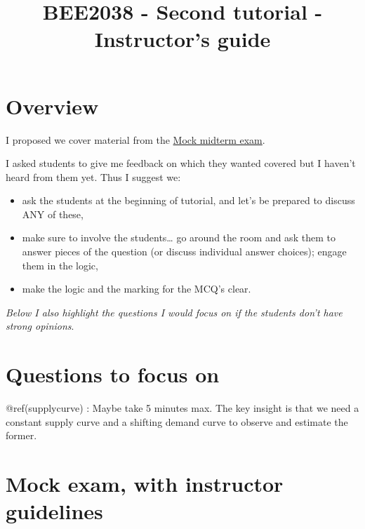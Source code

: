 \documentclass[]{article}
\title{BEE2038 - Second tutorial - Instructor's guide}
\author{}
\date{}
\begin{document}
\maketitle

\hypertarget{overview}{%
\section{Overview}\label{overview}}

I proposed we cover material from the
\href{https://vle.exeter.ac.uk/pluginfile.php/1435123/mod_resource/content/1/_book/ps.html\#mock-mid-term-exam}{Mock
midterm exam}.

I asked students to give me feedback on which they wanted covered but I
haven't heard from them yet. Thus I suggest we:

\begin{itemize}
\item
  ask the students at the beginning of tutorial, and let's be prepared
  to discuss ANY of these,
\item
  make sure to involve the students\ldots{} go around the room and ask
  them to answer pieces of the question (or discuss individual answer
  choices); engage them in the logic,
\item
  make the logic and the marking for the MCQ's clear.
\end{itemize}

\emph{Below I also highlight the questions I would focus on if the
students don't have strong opinions}.

\hypertarget{questions-to-focus-on}{%
\section{Questions to focus on}\label{questions-to-focus-on}}

@ref(supplycurve) : Maybe take 5 minutes max. The key insight is that we
need a constant supply curve and a shifting demand curve to observe and
estimate the former.

\hypertarget{mock-exam-with-instructor-guidelines}{%
\section{Mock exam, with instructor
guidelines}\label{mock-exam-with-instructor-guidelines}}

\hypertarget{section}{%
\subsubsection{}\label{section}}
\end{document}
